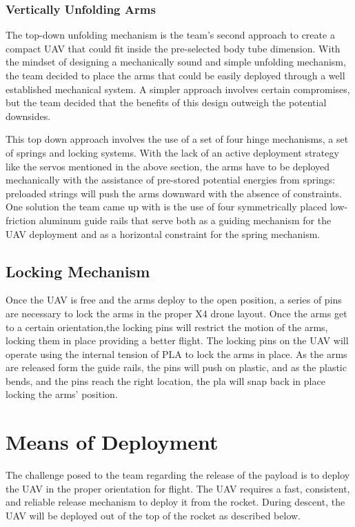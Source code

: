 		\subsubsection{Vertically Unfolding Arms}
			The top-down unfolding mechanism is the team’s second approach to create a compact UAV that could fit inside the pre-selected body tube dimension. With the mindset of designing a mechanically sound and simple unfolding mechanism, the team decided to place the arms that could be easily deployed through a well established mechanical system. A simpler approach involves certain compromises, but the team decided that the benefits of this design outweigh the potential downsides. 

			This top down approach involves the use of a set of four hinge mechanisms, a set of springs and locking systems. With the lack of an active deployment strategy like the servos mentioned in the above section, the arms have to be deployed mechanically with the assistance of pre-stored potential energies from springs: preloaded strings will push the arms downward with the absence of constraints. One solution the team came up with is the use of four symmetrically placed low-friction aluminum guide rails that serve both as a guiding mechanism for the UAV deployment and as a horizontal constraint for the spring mechanism.
	
	\subsection{Locking Mechanism}
		Once the UAV is free and the arms deploy to the open position, a series of pins are necessary to lock the arms in the proper X4 drone layout.  Once the arms get to a certain orientation,the locking pins will restrict the motion of the arms, locking them in place providing a better flight.  The locking pins on the UAV will operate using the internal tension of PLA to lock the arms in place.  As the arms are released form the guide rails, the pins will push on plastic, and as the plastic bends, and the pins reach the right location, the pla will snap back in place locking the arms’ position. 



\section{Means of Deployment}\label{PL:Tradeoffs:Deployment}
	The challenge posed to the team regarding the release of the payload is to deploy the UAV in the proper orientation for flight. The UAV requires a fast, consistent, and reliable release mechanism to deploy it from the rocket. During descent, the UAV will be deployed out of the top of the rocket as described below. 

